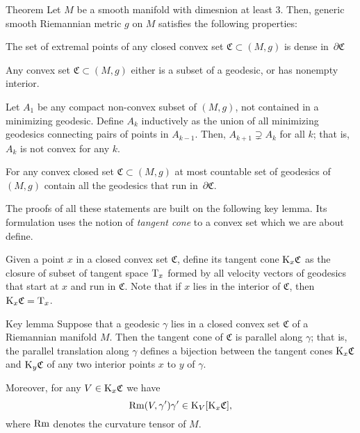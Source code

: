 \documentclass[a4paper,10pt]{article}
\begin{document}
\begin{thm}{Theorem}
Let $M$ be a smooth manifold with dimesnion at least 3.
Then, generic smooth Riemannian metric $g$ on $M$ satisfies the following properties:

\begin{subthm}{}
The set of extremal points of any closed convex set $\mathfrak{C}\subset (M,g)$ is dense in~$\partial\mathfrak{C}$
\end{subthm}

\begin{subthm}{}
Any convex set $\mathfrak{C}\subset (M,g)$ either is a subset of a geodesic, or has nonempty interior.
\end{subthm}


\begin{subthm}{}
Let $A_1$ be any compact non-convex  subset of $(M,g)$, not contained in a minimizing  geodesic. Define  $A_k$ inductively as  the union of all minimizing geodesics connecting pairs of  points in 
$A_{k-1}$.
Then, $A_{k+1}\supsetneq A_k$ for all $k$;
that is, $A_k$ is not convex for any $k$.
\end{subthm}


\begin{subthm}{}
For any convex closed set $\mathfrak{C}\subset (M,g)$ at most countable set of geodesics of $(M,g)$ contain all the geodesics that run in~$\partial\mathfrak{C}$.
\end{subthm}
\end{thm}

The proofs of all these statements are built on the following key lemma.
Its formulation uses the notion of \emph{tangent cone} to a convex set which we are about define.

Given a point $x$ in a closed convex set $\mathfrak{C}$, define its tangent cone $\mathrm{K}_x\mathfrak{C}$ as the closure of subset of tangent space $\mathrm{T}_x$ formed by all velocity vectors of geodesics that start at $x$ and run in $\mathfrak{C}$.
Note that if $x$ lies in the interior of $\mathfrak{C}$, then $\mathrm{K}_x\mathfrak{C}=\mathrm{T}_x$.
 
\begin{thm}{Key lemma}
Suppose that a geodesic $\gamma$ lies in a closed convex set $\mathfrak{C}$ of a Riemannian manifold $M$.
Then the tangent cone of $\mathfrak{C}$ is parallel along $\gamma$; that is, the parallel translation along $\gamma$ defines a bijection between the tangent cones $\mathrm{K}_x\mathfrak{C}$ and $\mathrm{K}_y\mathfrak{C}$ of any two interior points $x$ to $y$ of $\gamma$.

Moreover, for any $V\in \mathrm{K}_x\mathfrak{C}$ we have
\[\operatorname{Rm}(V,\gamma')\gamma'\in \mathrm{K}_V[\mathrm{K}_x\mathfrak{C}],\]
where $\operatorname{Rm}$ denotes the curvature tensor of $M$.
\end{thm}
  
\end{document}
